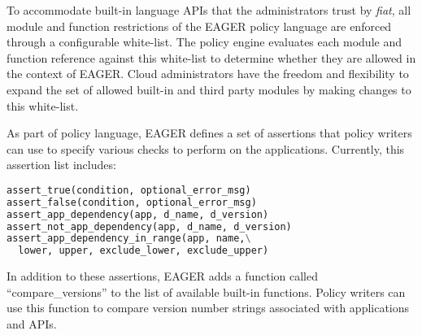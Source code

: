 To accommodate built-in language APIs that the administrators trust by {\em fiat},
all module and function restrictions of the EAGER policy language are enforced
through a configurable white-list. The policy engine evaluates each module and function
reference against this white-list to determine whether they are allowed in the context of
EAGER. Cloud administrators have the freedom
and flexibility to expand the set of allowed built-in and third party modules by making
changes to this white-list.

As part of policy language, EAGER
defines a set of assertions that policy writers can use to specify various 
checks to perform on the applications. 
Currently, this assertion list includes:

\vspace{0.05in}
{\footnotesize 
\begin{lstlisting}[language=Python, frame=single]
assert_true(condition, optional_error_msg)
assert_false(condition, optional_error_msg)
assert_app_dependency(app, d_name, d_version)
assert_not_app_dependency(app, d_name, d_version)
assert_app_dependency_in_range(app, name,\
  lower, upper, exclude_lower, exclude_upper)
\end{lstlisting}
}


In addition to these assertions, EAGER adds a function
called ``compare\_versions'' to the list 
of available built-in functions. Policy
writers can use this function to compare version 
number strings associated with
applications and APIs.


